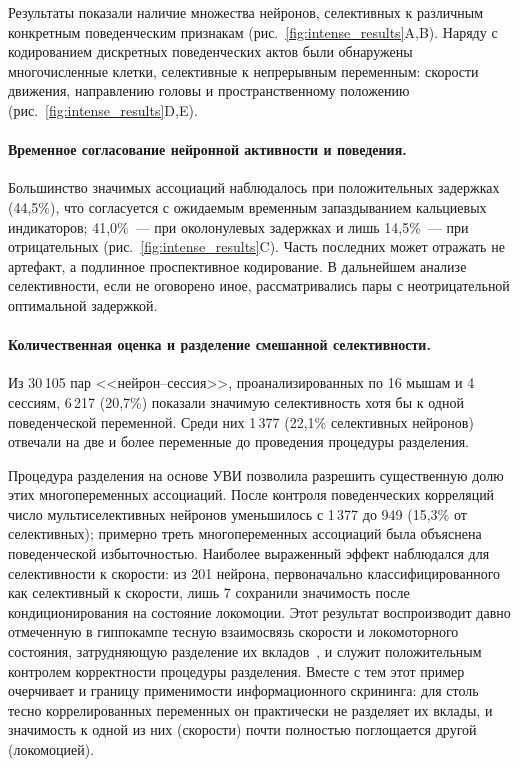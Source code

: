 Результаты показали наличие множества нейронов, селективных к различным конкретным поведенческим признакам (рис.~\ref{fig:intense_results}A,B). Наряду с кодированием дискретных поведенческих актов были обнаружены многочисленные клетки, селективные к непрерывным переменным: скорости движения, направлению головы и пространственному положению (рис.~\ref{fig:intense_results}D,E).

\paragraph{Временное согласование нейронной активности и поведения.} Большинство значимых ассоциаций наблюдалось при положительных задержках (44{,}5\%), что согласуется с ожидаемым временным запаздыванием кальциевых индикаторов; 41{,}0\%~--- при околонулевых задержках и лишь 14{,}5\%~--- при отрицательных (рис.~\ref{fig:intense_results}C). Часть последних может отражать не артефакт, а подлинное проспективное кодирование. В дальнейшем анализе селективности, если не оговорено иное, рассматривались пары с неотрицательной оптимальной задержкой.

\paragraph{Количественная оценка и разделение смешанной селективности.} Из 30\,105 пар <<нейрон--сессия>>, проанализированных по 16 мышам и 4 сессиям, 6\,217 (20{,}7\%) показали значимую селективность хотя бы к одной поведенческой переменной. Среди них 1\,377 (22{,}1\% селективных нейронов) отвечали на две и более переменные до проведения процедуры разделения.

Процедура разделения на основе УВИ позволила разрешить существенную долю этих многопеременных ассоциаций. После контроля поведенческих корреляций число мультиселективных нейронов уменьшилось с 1\,377 до 949 (15{,}3\% от селективных); примерно треть многопеременных ассоциаций была объяснена поведенческой избыточностью. Наиболее выраженный эффект наблюдался для селективности к скорости: из 201 нейрона, первоначально классифицированного как селективный к скорости, лишь 7 сохранили значимость после кондиционирования на состояние локомоции. Этот результат воспроизводит давно отмеченную в гиппокампе тесную взаимосвязь скорости и локомоторного состояния, затрудняющую разделение их вкладов~\cite{Vanderwolf1969, McNaughton1983}, и служит положительным контролем корректности процедуры разделения. Вместе с тем этот пример очерчивает и границу применимости информационного скрининга: для столь тесно коррелированных переменных он практически не разделяет их вклады, и значимость к одной из них (скорости) почти полностью поглощается другой (локомоцией).

